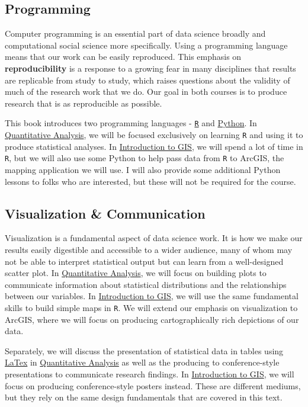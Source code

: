 \documentclass[]{book}
\theoremstyle{definition}
\theoremstyle{definition}
\theoremstyle{definition}
\theoremstyle{remark}
\begin{document}
\subsection{Programming}\label{programming}

Computer programming is an essential part of data science broadly and
computational social science more specifically. Using a programming
language means that our work can be easily reproduced. This emphasis on
\textbf{reproducibility} is a response to a growing fear in many
disciplines that results are replicable from study to study, which
raises questions about the validity of much of the research work that we
do. Our goal in both courses is to produce research that is as
reproducible as possible.

This book introduces two programming languages -
\href{https://en.wikipedia.org/wiki/R_(programming_language)}{\texttt{R}}
and
\href{https://en.wikipedia.org/wiki/Python_(programming_language)}{Python}.
In \href{https://slu-soc5050.github.io}{Quantitative Analysis}, we will
be focused exclusively on learning \texttt{R} and using it to produce
statistical analyses. In
\href{https://slu-soc5650.github.io}{Introduction to GIS}, we will spend
a lot of time in \texttt{R}, but we will also use some Python to help
pass data from \texttt{R} to ArcGIS, the mapping application we will
use. I will also provide some additional Python lessons to folks who are
interested, but these will not be required for the course.

\subsection{Visualization \&
Communication}\label{visualization-communication}

Visualization is a fundamental aspect of data science work. It is how we
make our results easily digestible and accessible to a wider audience,
many of whom may not be able to interpret statistical output but can
learn from a well-designed scatter plot. In
\href{https://slu-soc5050.github.io}{Quantitative Analysis}, we will
focus on building plots to communicate information about statistical
distributions and the relationships between our variables. In
\href{https://slu-soc5650.github.io}{Introduction to GIS}, we will use
the same fundamental skills to build simple maps in \texttt{R}. We will
extend our emphasis on visualization to ArcGIS, where we will focus on
producing cartographically rich depictions of our data.

Separately, we will discuss the presentation of statistical data in
tables using \href{https://en.wikipedia.org/wiki/LaTeX}{LaTex} in
\href{https://slu-soc5050.github.io}{Quantitative Analysis} as well as
the producing to conference-style presentations to communicate research
findings. In \href{https://slu-soc5650.github.io}{Introduction to GIS},
we will focus on producing conference-style posters instead. These are
different mediums, but they rely on the same design fundamentals that
are covered in this text.
\end{document}
